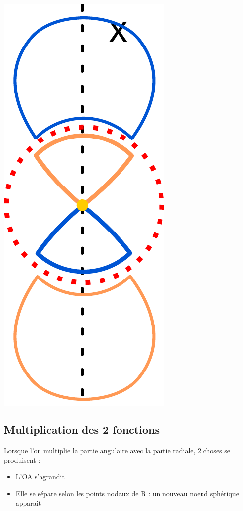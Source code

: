 \documentclass[french]{yLectureNote}
\begin{document}
\includegraphics[scale=0.4]{noeuds}

\subsection{Multiplication des 2 fonctions}
Lorsque l'on multiplie la partie angulaire avec la partie radiale, 2 choses se produisent :
\begin{itemize}
\item L'OA s'agrandit
\item Elle se sépare selon les points nodaux de R : un nouveau noeud sphérique apparait
\end{itemize}
\end{document}

